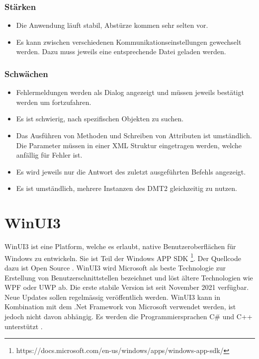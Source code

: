 \subsubsection{Stärken}
\begin{itemize}
   \item Die Anwendung läuft stabil, Abstürze kommen sehr selten vor.
   \item Es kann zwischen verschiedenen Kommunikationseinstellungen gewechselt werden. Dazu muss jeweils eine entsprechende Datei geladen werden.
\end{itemize}

\subsubsection{Schwächen}
\begin{itemize}
   \item Fehlermeldungen werden als Dialog angezeigt und müssen jeweils bestätigt werden um fortzufahren.
   \item Es ist schwierig, nach spezifischen Objekten zu suchen.
   \item Das Ausführen von Methoden und Schreiben von Attributen ist umständlich. Die Parameter müssen in einer XML Struktur eingetragen werden, welche anfällig für Fehler ist.
   \item Es wird jeweils nur die Antwort des zuletzt ausgeführten Befehls angezeigt.
   \item Es ist umständlich, mehrere Instanzen des \ac{DMT2} gleichzeitig zu nutzen. 
\end{itemize}


\section{WinUI3}
WinUI3 ist eine Platform, welche es erlaubt, native Benutzeroberflächen für Windows zu entwickeln.
Sie ist Teil der Windows APP SDK \footnote{https://docs.microsoft.com/en-us/windows/apps/windows-app-sdk/}.
Der Quellcode dazu ist Open Source \parencite{winuiintro}.
WinUI3 wird Microsoft als beste Technologie zur Erstellung von Benutzerschnittstellen bezeichnet und löst ältere Technologien wie \ac{WPF} oder \ac{UWP} ab.
Die erste stabile Version ist seit November 2021 verfügbar.
Neue Updates sollen regelmässig veröffentlich werden.
WinUI3 kann in Kombination mit dem .Net Framework von Microsoft verwendet werden, ist jedoch nicht davon abhängig.
Es werden die Programmiersprachen C\# und C++ unterstützt \parencite{winuiroadmap}.


\pagebreak

\pagebreak



